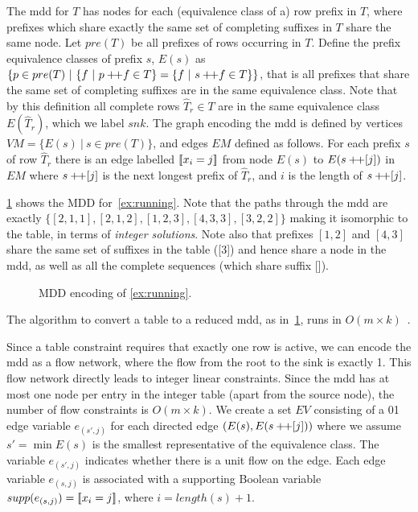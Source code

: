 \documentclass[a4paper,UKenglish,cleveref,autoref,thm-restate]{lipics-v2021}
\begin{document}
The \gls{mdd} for $T$ has nodes for each (equivalence class of a) row prefix in $T$, where prefixes which share exactly the same set of completing suffixes in $T$ share the same node.
Let $pre(T)$ be all prefixes of rows occurring in $T$.
Define the prefix equivalence classes of prefix $s$,
$E(s)$ 
as $\{ p \in pre(T) ~|~ \{ f ~|~ p +\!\!+ f \in T\} = \{ f ~|~ s +\!\!+ f \in T\}\}$, that is all prefixes that share the same set of completing suffixes are in the same equivalence class. 
Note that by this definition all complete rows $\hat{T}_r \in T$ are in the same equivalence class $E(\hat{T}_r)$, which we label $snk$.
The graph encoding the \gls{mdd} is defined by
vertices $VM = \{ E(s)~|~ s \in pre(T) \}$, 
and edges $EM$ defined as follows.
For each prefix $s$ of row $\hat{T}_r$ 
there is an edge labelled $[\![x_{i} = j]\!]$ from node
$E(s)$ to $E(s +\!\!+ [j])$ in $EM$ where $s +\!\!+ [j]$ is the next longest prefix of $\hat{T}_r$, and $i$ is the length of $s +\!\!+ [j]$. 


\cref{fig:mdd} shows the MDD for~\cref{ex:running}.
Note that the paths through the \gls{mdd} are exactly
$\{ [2,1,1], [2,1,2], [1,2,3], [4,3,3], [3,2,2]\}$ making it isomorphic to the table, in terms of \emph{integer solutions}.
Note also that prefixes $[1,2]$ and $[4,3]$ share the same set of suffixes in the table ([3]) and hence share a node in the \gls{mdd}, as well as all the complete sequences (which share suffix []). 





\begin{figure}[H]
\centering
\mddDiagram{15mm}{12mm}
\caption{MDD encoding of \cref{ex:running}.}
\label{fig:mdd}
\end{figure}

The algorithm to convert a table to a reduced \gls{mdd}, as in~\cref{fig:mdd}, runs in $O(m \times k)$~\cite{DBLP:journals/constraints/ChengY10}. 

Since a table constraint requires that exactly one row is active, we can encode the \gls{mdd} as a flow network, where the flow from the root to the sink is exactly 1. This flow network directly leads to integer linear constraints. Since the \gls{mdd} has at most one node per entry in the integer table (apart from the source node), the number of flow constraints is $O(m \times k)$.
We create a set $EV$ consisting of a 01 edge variable $e_{(s',j)}$ for each directed edge $(E(s),E(s +\!\!+ [j]))$ where
we assume $s' = \min E(s)$ is the smallest representative of the equivalence class.
The variable $e_{(s',j)}$ indicates whether there is a unit flow on the edge.
Each edge variable $e_{(s, j)}$ is associated with a supporting Boolean variable $supp(e_{(s,j)}) = [\![x_i = j]\!]$, where $i = length(s) + 1$. 
\end{document}
